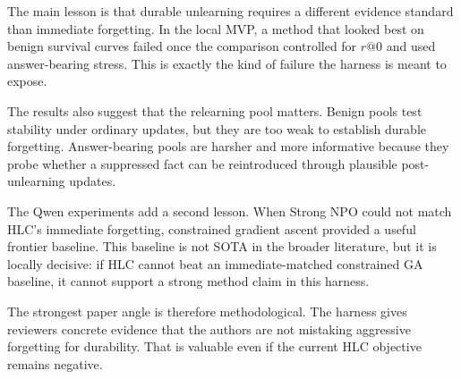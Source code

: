 The main lesson is that durable unlearning requires a different evidence standard than immediate forgetting.
In the local MVP, a method that looked best on benign survival curves failed once the comparison controlled for $r@0$ and used answer-bearing stress.
This is exactly the kind of failure the harness is meant to expose.

The results also suggest that the relearning pool matters.
Benign pools test stability under ordinary updates, but they are too weak to establish durable forgetting.
Answer-bearing pools are harsher and more informative because they probe whether a suppressed fact can be reintroduced through plausible post-unlearning updates.

The Qwen experiments add a second lesson.
When Strong NPO could not match HLC's immediate forgetting, constrained gradient ascent provided a useful frontier baseline.
This baseline is not SOTA in the broader literature, but it is locally decisive: if HLC cannot beat an immediate-matched constrained GA baseline, it cannot support a strong method claim in this harness.

The strongest paper angle is therefore methodological.
The harness gives reviewers concrete evidence that the authors are not mistaking aggressive forgetting for durability.
That is valuable even if the current HLC objective remains negative.
